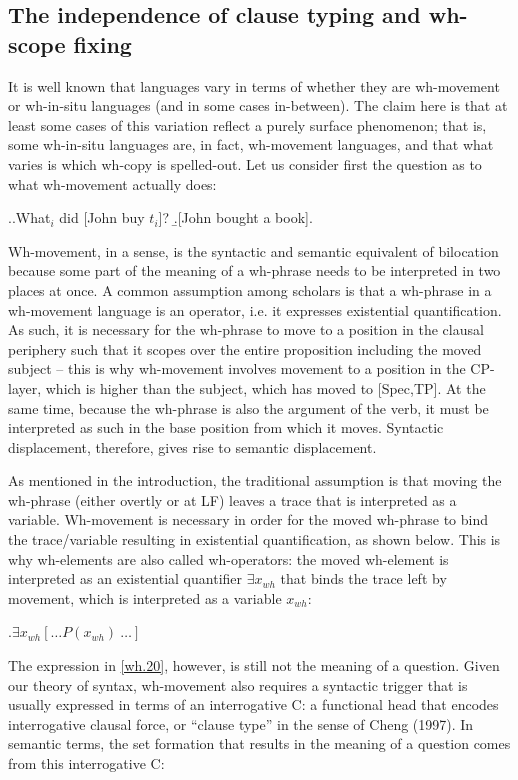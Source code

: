 \documentclass[charis]{glossa}
\begin{document}
\subsection{The independence of clause typing and wh-scope fixing}
It is well known that languages vary in terms of whether they are wh-movement or wh-in-situ languages (and in some cases in-between). The claim here is that at least some cases of this variation reflect a purely surface phenomenon; that is, some wh-in-situ languages are, in fact, wh-movement languages, and that what varies is which wh-copy is spelled-out. Let us consider first the question as to what wh-movement actually does:

\ex.\label{wh.10}\a.\label{2.10a}What$_i$ did [John buy $t_i$]?
	\b.\label{2.10b}[John bought a book].

Wh-movement, in a sense, is the syntactic and semantic equivalent of bilocation because some part of the meaning of a wh-phrase needs to be interpreted in two places at once. A common assumption among scholars is that a wh-phrase in a wh-movement language is an operator, i.e. it expresses existential quantification. As such, it is necessary for the wh-phrase to move to a position in the clausal periphery such that it scopes over the entire proposition including the moved subject -- this is why wh-movement involves movement to a position in the CP-layer, which is higher than the subject, which has moved to [Spec,TP]. At the same time, because the wh-phrase is also the argument of the verb, it must be interpreted as such in the base position from which it moves. Syntactic displacement, therefore, gives rise to semantic displacement.

As mentioned in the introduction, the traditional assumption is that moving the wh-phrase (either overtly or at LF) leaves a trace that is interpreted as a variable. Wh-movement is necessary in order for the moved wh-phrase to bind the trace/variable resulting in existential quantification, as shown below. This is why wh-elements are also called wh-operators: the moved wh-element is interpreted as an existential quantifier $\exists x_{wh}$ that binds the trace left by movement, which is interpreted as a variable $x_{wh}$:

\ex.\label{wh.20}$\exists x_{wh}[\dots P(x_{wh})\ \dots]$

The expression in \ref{wh.20}, however, is still not the meaning of a question. Given our theory of syntax, wh-movement also requires a syntactic trigger that is usually expressed in terms of an interrogative C: a functional head that encodes interrogative clausal force, or ``clause type'' in the sense of Cheng (1997). In semantic terms, the set formation that results in the meaning of a question comes from this interrogative C:
\end{document}
